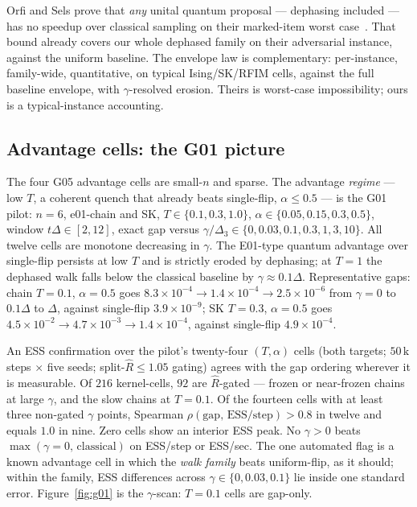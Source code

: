 \documentclass[aps,prx,reprint,floatfix,amsmath,amssymb,amsfonts]{revtex4-2}
\begin{document}
Orfi and Sels prove that \emph{any} unital quantum proposal ---
dephasing included --- has no speedup over classical sampling on their
marked-item worst case~\cite{OrfiSels2024}. That bound already covers
our whole dephased family on their adversarial instance, against the
uniform baseline. The envelope law is complementary: per-instance,
family-wide, quantitative, on typical Ising/SK/RFIM cells, against the
full baseline envelope, with $\gamma$-resolved erosion. Theirs is
worst-case impossibility; ours is a typical-instance accounting.

\subsection{Advantage cells: the G01 picture}
\label{sec:g01}

The four G05 advantage cells are small-$n$ and sparse. The advantage
\emph{regime} --- low $T$, a coherent quench that already beats
single-flip, $\alpha\le 0.5$ --- is the G01 pilot: $n=6$, e01-chain and
SK, $T\in\{0.1,0.3,1.0\}$, $\alpha\in\{0.05,0.15,0.3,0.5\}$, window
$t\Delta\in[2,12]$, exact gap versus
$\gamma/\Delta_3\in\{0,0.03,0.1,0.3,1,3,10\}$. All twelve cells are
monotone decreasing in $\gamma$. The E01-type quantum advantage over
single-flip persists at low $T$ and is strictly eroded by dephasing; at
$T=1$ the dephased walk falls below the classical baseline by
$\gamma\approx 0.1\Delta$. Representative gaps: chain $T=0.1$,
$\alpha=0.5$ goes
$8.3\times 10^{-4}\to 1.4\times 10^{-4}\to 2.5\times 10^{-6}$ from
$\gamma=0$ to $0.1\Delta$ to $\Delta$, against single-flip
$3.9\times 10^{-9}$; SK $T=0.3$, $\alpha=0.5$ goes
$4.5\times 10^{-2}\to 4.7\times 10^{-3}\to 1.4\times 10^{-4}$, against
single-flip $4.9\times 10^{-4}$.

An ESS confirmation over the pilot's twenty-four $(T,\alpha)$ cells
(both targets; $50\,\mathrm{k}$ steps $\times$ five seeds;
split-$\hat R\le 1.05$ gating) agrees with the gap ordering wherever it
is measurable. Of $216$ kernel-cells, $92$ are $\hat R$-gated --- frozen
or near-frozen chains at large $\gamma$, and the slow chains at
$T=0.1$. Of the fourteen cells with at least three non-gated $\gamma$
points, Spearman $\rho(\mathrm{gap},\,\mathrm{ESS/step})>0.8$ in twelve
and equals $1.0$ in nine. Zero cells show an interior ESS peak. No
$\gamma>0$ beats $\max(\gamma=0,\,\text{classical})$ on ESS/step or
ESS/sec. The one automated flag is a known advantage cell in which the
\emph{walk family} beats uniform-flip, as it should; within the family,
ESS differences across $\gamma\in\{0,0.03,0.1\}$ lie inside one standard
error. Figure~\ref{fig:g01} is the $\gamma$-scan: $T=0.1$ cells are
gap-only.
\end{document}
